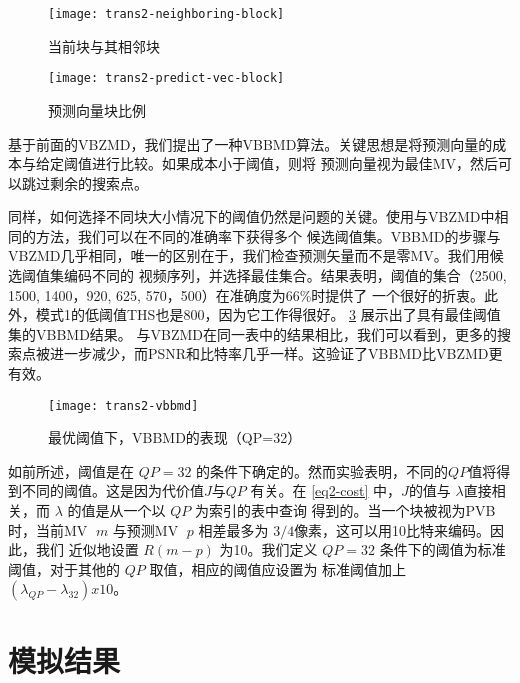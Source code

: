 \begin{figure}[H] %
  \centering
  \texttt{[image: trans2-neighboring-block]}
  \caption{当前块与其相邻块}
  \label{fig:trans2-neighboring-block}
\end{figure}

\begin{figure}[H] %
  \centering
  \texttt{[image: trans2-predict-vec-block]}
  \caption{预测向量块比例}
  \label{fig:trans2-predict-vec-block}
\end{figure}

基于前面的VBZMD，我们提出了一种VBBMD算法。关键思想是将预测向量的成本与给定阈值进行比较。如果成本小于阈值，则将
预测向量视为最佳MV，然后可以跳过剩余的搜索点。

同样，如何选择不同块大小情况下的阈值仍然是问题的关键。使用与VBZMD中相同的方法，我们可以在不同的准确率下获得多个
候选阈值集。VBBMD的步骤与VBZMD几乎相同，唯一的区别在于，我们检查预测矢量而不是零MV。我们用候选阈值集编码不同的
视频序列，并选择最佳集合。结果表明，阈值的集合（2500, 1500, 1400，920, 625, 570，500）在准确度为66\%时提供了
一个很好的折衷。此外，模式1的低阈值THS也是800，因为它工作得很好。 \ref{fig:trans2-vbbmd} 展示出了具有最佳阈值集的VBBMD结果。
与VBZMD在同一表中的结果相比，我们可以看到，更多的搜索点被进一步减少，而PSNR和比特率几乎一样。这验证了VBBMD比VBZMD更有效。

\begin{figure}[H] %
  \centering
  \texttt{[image: trans2-vbbmd]}
  \caption{最优阈值下，VBBMD的表现（QP=32）}
  \label{fig:trans2-vbbmd}
\end{figure}

如前所述，阈值是在 $QP=32$ 的条件下确定的。然而实验表明，不同的$QP$值将得到不同的阈值。这是因为代价值$J$与$QP$
有关。在 \ref{eq2-cost} 中，$J$的值与 $\lambda$直接相关，而 $\lambda$ 的值是从一个以 $QP$ 为索引的表中查询
得到的。当一个块被视为PVB时，当前MV $\;m$ 与预测MV $\;p$ 相差最多为 $3/4$像素，这可以用10比特来编码。因此，我们
近似地设置 $R(m-p)$ 为10。我们定义 $QP=32$ 条件下的阈值为标准阈值，对于其他的 $QP$ 取值，相应的阈值应设置为
标准阈值加上 $ (\lambda_{QP} - \lambda_{32}) x 10$。

\section{模拟结果}
\label{sec:app2-sim-result}

